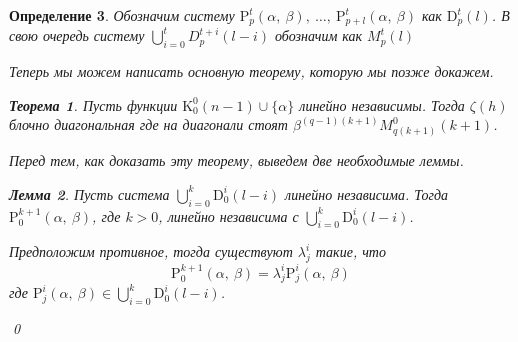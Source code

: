 \documentclass[12pt, reqno, a4paper, oneside, notitlepage]{amsart}
\makeatletter
\theoremstyle{mytheoremstyle}
\newtheorem{theorem}{Теорема}[section]
\newtheorem{lemma}[theorem]{Лемма}
\theoremstyle{myremarkstyle}
\newtheorem{definition}[theorem]{Определение}
\numberwithin{equation}{section}
\renewenvironment{proof}[1][\proofname]{\par\indent {\bfseries #1\@addpunct{.} }}{\qed}
\makeatother
\begin{document}
\begin{definition}
Обозначим систему $\mathrm{P}^t_p(\alpha,\ \beta),\ \dots,\ \mathrm{P}^t_{p+l}(\alpha,\ \beta)$ как $\mathrm{D}^t_p(l)$.
В свою очередь систему $\bigcup\limits_{i=0}^t D^{t+i}_p(l-i)$ обозначим как 
$M^t_p(l)$


Теперь мы можем написать основную теорему, которую мы позже докажем.

\begin{theorem}\label{main}
  Пусть функции $\mathrm{K}^0_0(n-1) \cup \{\alpha\}$ линейно независимы. 
  Тогда $\zeta(h)$ блочно диагональная где на диагонали стоят 
  $\beta^{(q-1)(k+1)}M^0_{q(k+1)}(k+1)$.
\end{theorem}

Перед тем, как доказать эту теорему, выведем две необходимые леммы.
\begin{lemma} \label{support1}
  Пусть система $\bigcup\limits_{i=0}^k\mathrm{D}^i_0(l-i)$ линейно независима. 
  Тогда $\mathrm{P}^{k+1}_0(\alpha,\ \beta)$, где $k >0$, 
  линейно независима с $\bigcup\limits_{i=0}^k\mathrm{D}^i_0(l-i)$.
\end{lemma}

\begin{proof}
  Предположим противное, тогда существуют $\lambda^i_j$ такие, что 
  \[
	\mathrm{P}^{k+1}_0(\alpha,\ \beta) = \lambda^i_j\mathrm{P}^{i}_j(\alpha,\ \beta)
  \]
 где $\mathrm{P}^{i}_j(\alpha,\ \beta)\in\bigcup\limits_{i=0}^k\mathrm{D}^i_0(l-i)$.


\end{proof}
\end{definition}
\end{document}
